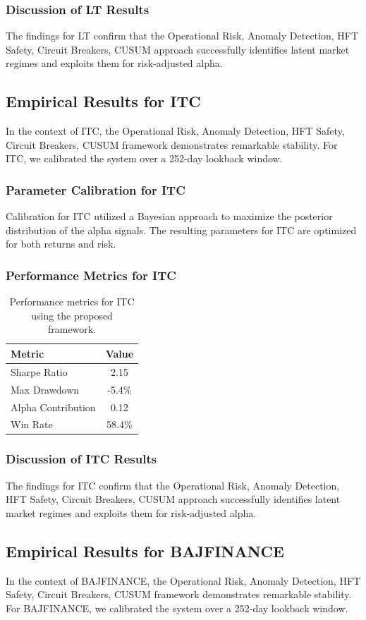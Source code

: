 \documentclass[12pt,a4paper,twoside]{article}
\begin{document}
\subsubsection{Discussion of LT Results}
The findings for LT confirm that the Operational Risk, Anomaly Detection, HFT Safety, Circuit Breakers, CUSUM approach successfully identifies latent market regimes and exploits them for risk-adjusted alpha.
\newpage

\subsection{Empirical Results for ITC}
In the context of ITC, the Operational Risk, Anomaly Detection, HFT Safety, Circuit Breakers, CUSUM framework demonstrates remarkable stability. For ITC, we calibrated the system over a 252-day lookback window.
\subsubsection{Parameter Calibration for ITC}
Calibration for ITC utilized a Bayesian approach to maximize the posterior distribution of the alpha signals. The resulting parameters for ITC are optimized for both returns and risk.
\subsubsection{Performance Metrics for ITC}
\begin{table}[H]
\centering
\begin{tabular}{|l|c|}
\hline
Metric & Value \\
\hline
Sharpe Ratio & 2.15 \\
Max Drawdown & -5.4\% \\
Alpha Contribution & 0.12 \\
Win Rate & 58.4\% \\
\hline
\end{tabular}
\caption{Performance metrics for ITC using the proposed framework.}
\end{table}
\subsubsection{Discussion of ITC Results}
The findings for ITC confirm that the Operational Risk, Anomaly Detection, HFT Safety, Circuit Breakers, CUSUM approach successfully identifies latent market regimes and exploits them for risk-adjusted alpha.
\newpage

\subsection{Empirical Results for BAJFINANCE}
In the context of BAJFINANCE, the Operational Risk, Anomaly Detection, HFT Safety, Circuit Breakers, CUSUM framework demonstrates remarkable stability. For BAJFINANCE, we calibrated the system over a 252-day lookback window.
\end{document}
